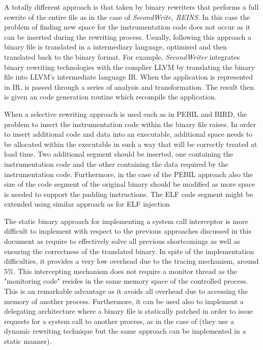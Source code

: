 A totally different approach is that taken by binary rewriters that performs a full rewrite of the entire file as in the case of \emph{SecondWrite, REINS}.  In this case the problem of finding new space for the instrumentation code does not occur as it can be inserted during the rewriting process. Usually, following this approach a binary file is translated in a intermediary language, optimised and then translated back to the binary format. For example, \emph{SecondWriter} integrates binary rewriting technologies with the complier LLVM \cite{LLVM} by translating the binary file into LLVM's intermediate language IR. When the application is represented in IR, is passed through a series of analysis and transformation. The result then is given an code generation routine which recompile the application.   


When a selective rewriting approach is used such as in PEBIL and BIRD, the problem to insert the instrumentation code within the binary file raises. In order to insert  additional code and data into an executable, additional space needs to be allocated within the executable in such a way that will be correctly treated at load time. Two additional segment should be inserted, one containing the instrumentation code and the other containing the data required by the instrumentation code. Furthermore, in the case of the PEBIL approach also the size of the code segment of the original binary should be modified as more space is needed to support the padding instructions. The ELF code segment might be extended using similar approach as for ELF injection \cite{ELF_inj}


The static binary approach for implementing a system call interceptor is more difficult to implement with respect to the previous approaches discussed in this document as require to  effectively solve all previous shortcomings as well as ensuring the correctness of the translated binary. In spite of the implementation difficulties, it provides a very low overhead due to the tracing mechanism, around 5\%. This intercepting mechanism does not require a monitor thread as the "monitoring code" resides in the same memory space of the controlled process. This is an remarkable advantage as it avoids all overhead due to accessing the memory of another process. 
Furthermore, it can be used also to implement a delegating architecture where a binary file is statically patched in order to issue requests for a system call to another process, as in the case of \cite{seccompsandbox,vx32} (they use a dynamic rewriting technique but the same approach can be implemented in a static manner). 

